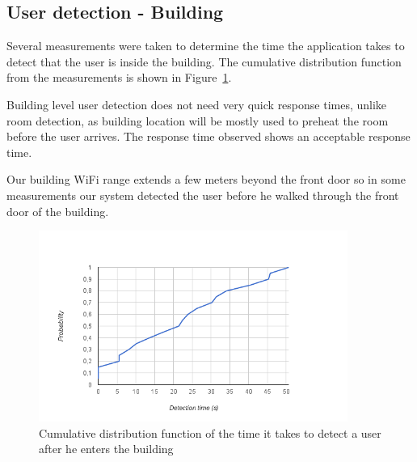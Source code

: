 \subsection{User detection - Building}

Several measurements were taken to determine the time the application takes to detect that the user is inside the building. The cumulative distribution function from the measurements is shown in Figure~\ref{eval:building1}.

Building level user detection does not need very quick response times, unlike room detection, as building location will be mostly used to preheat the room before the user arrives. The response time observed shows an acceptable response time.



Our building \ac{WiFi} range extends a few meters beyond the front door so in some measurements our system detected the user before he walked through the front door of the building.

\begin{figure}[]
\centering
\includegraphics[width=0.9\textwidth]{Figures/building_detection_cumulative}
\caption{Cumulative distribution function of the time it takes to detect a user  after he enters the building}
\label{eval:building1}
\end{figure}





